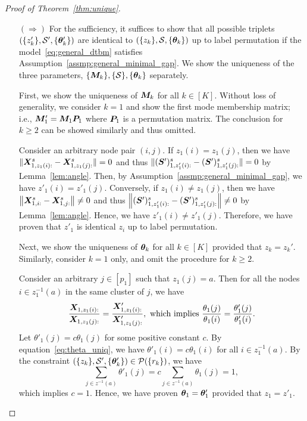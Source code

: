 \documentclass[lettersize,onecolumn,journal]{IEEEtran}
\theoremstyle{definition}
\theoremstyle{definition}
\newcommand{\of}[1]{\left(#1\right)}
\begin{document}
\begin{proof}[Proof of Theorem~\ref{thm:unique}]
\begin{enumerate}[wide]
\item[$(\Rightarrow)$] For the sufficiency, it suffices to show that all possible triplets $\of{ \{z'_k\}, \tS', \{ \mtheta'_k \} }$ are identical to $\of{ \{z_k\}, \tS, \{ \mtheta_k \} }$ up to label permutation if the model~\eqref{eq:general_dtbm} satisfies Assumption~\eqref{assmp:general_minimal_gap}. We show the uniqueness of the three parameters, $\{\bm M_k\}, \{\mathcal{S}\}, \{\boldsymbol{\theta}_k\}$ separately.

First, we show the uniqueness of $\bm M_k$ for all $k \in [K]$. Without loss of generality, we consider $k=1$ and show the first mode membership matrix; i.e., $\bm M'_1 = \bm M_1\bm{P}_1$ where $\bm{P}_1$ is a permutation matrix. The conclusion for $k\geq 2$ can be showed similarly and thus omitted. 

Consider an arbitrary node pair $(i,j)$. If $z_1(i) = z_1(j)$, then we have $\lVert\bm X_{1, z_1(i):}^s - \bm X_{1, z_1(j):}^s \rVert = 0$ and thus $\lVert (\bm S')_{1, z'_1(i):}^{s} - (\bm S')_{1, z'_1(j):}^{s} \rVert = 0$ by Lemma~\ref{lem:angle}. Then, by Assumption~\eqref{assmp:general_minimal_gap}, we have $z'_1(i) = z'_1(j)$. Conversely, if $z_1(i) \neq z_1(j)$, then we have $ \left\lVert\bm X_{1,i:}^s - \bm X_{1,j:}^s\right\rVert \neq 0$ and thus $\left\lVert (\bm S')_{1, z'_1(i):}^{s} - (\bm S')_{1, z'_1(j):}^{s} \right\rVert \neq 0$ by Lemma~\ref{lem:angle}. Hence, we have $z'_1(i) \neq z'_1(j)$. Therefore, we have proven that $z'_1$ is identical $z_i$ up to label permutation.

Next, we show the uniqueness of $\boldsymbol{\theta}_k$ for all $k \in [K]$ provided that $z_k = z_k'$. Similarly, consider $k=1$ only, and omit the procedure for $k\geq 2$. 

Consider an arbitrary $j \in [p_1]$ such that $z_1(j) = a$. Then for all the nodes $i \in  z_1^{-1}(a)$ in the same cluster of $j$, we have 
\begin{equation}
    \frac{\mX_{1,z_1(i):}}{\mX_{1,z_1(j):}} = \frac{\mX'_{1,z_1(i):}}{\mX'_{1,z_1(j):}}, \text{ which implies }  \frac{\theta_1(j)}{\theta_1(i)} = \frac{\theta'_1(j)}{\theta'_1(i)}.\label{eq:theta_uniq}
\end{equation}
Let $\theta'_1(j) = c\theta_1(j)$ for some positive constant $c$. By equation~\eqref{eq:theta_uniq}, we have $\theta'_1(i) = c \theta_1(i)$ for all $ i \in  z_1^{-1}(a)$. By the constraint $(\{z_k\}, \mathcal{S}', \{\boldsymbol{\theta}'_k\}) \in \mathcal{P}(\{r_k\})$, we have 
\begin{equation}
    \sum_{j \in z^{-1}(a)} \theta'_1(j) = c \sum_{j \in z^{-1}(a)} \theta_1(j) = 1,
\end{equation}
which implies $c = 1$. Hence, we have proven $\boldsymbol{\theta}_1 = \boldsymbol{\theta}'_1$ provided that $z_1 = z'_1$.


\end{enumerate}
\end{proof}
\end{document}
